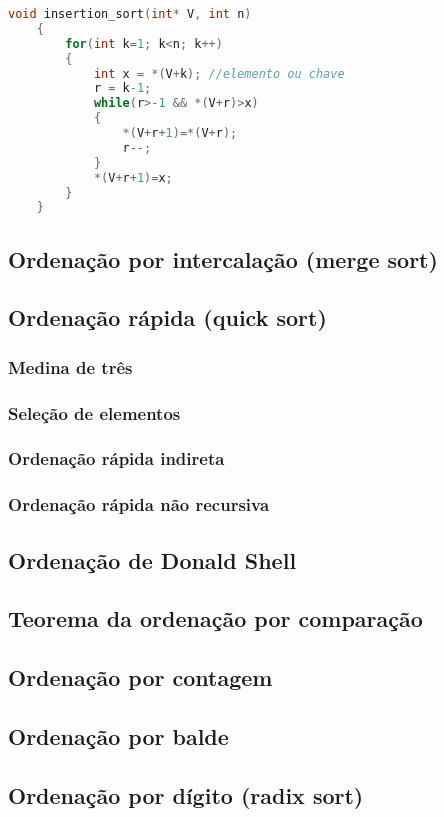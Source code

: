 \begin{lstlisting}[language=C, frame=single]
    void insertion_sort(int* V, int n)
    {
        for(int k=1; k<n; k++)
        {
            int x = *(V+k); //elemento ou chave
            r = k-1;
            while(r>-1 && *(V+r)>x)
            {
                *(V+r+1)=*(V+r);
                r--;
            }
            *(V+r+1)=x;
        }
    }
\end{lstlisting}

\subsection{Ordenação por intercalação (merge sort)}

\subsection{Ordenação rápida (quick sort)}

\subsubsection{Medina de três}

\subsubsection{Seleção de elementos}

\subsubsection{Ordenação rápida indireta}

\subsubsection{Ordenação rápida não recursiva}

\subsection{Ordenação de Donald Shell}

\subsection{Teorema da ordenação por comparação}

\subsection{Ordenação por contagem}

\subsection{Ordenação por balde}

\subsection{Ordenação por dígito (radix sort)}
